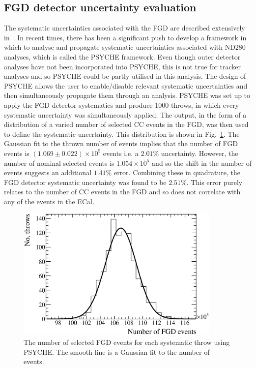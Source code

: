 \subsection{FGD detector uncertainty evaluation}
\label{subsec:FGDDetectorSystematics}
The systematic uncertainties associated with the FGD are described extensively in~\cite{CCIncSelFGDTN}.  In recent times, there has been a significant push to develop a framework in which to analyse and propagate systematic uncertainties associated with ND280 analyses, which is called the PSYCHE framework.  Even though outer detector analyses have not been incorporated into PSYCHE, this is not true for tracker analyses and so PSYCHE could be partly utilised in this analysis.  The design of PSYCHE allows the user to enable/disable relevant systematic uncertainties and then simultaneously propagate them through an analysis.  PSYCHE was set up to apply the FGD detector systematics and produce 1000 throws, in which every systematic uncertainty was simultaneously applied.  The output, in the form of a distribution of a varied number of selected CC events in the FGD, was then used to define the systematic uncertainty.  This distribution is shown in Fig.~\ref{fig:FGDSystematicsNEvents}.  The Gaussian fit to the thrown number of events implies that the number of FGD events is $(1.069\pm0.022)\times10^5$ events i.e. a $2.01\%$ uncertainty.  However, the number of nominal selected events is $1.054\times10^5$ and so the shift in the number of events suggests an additional $1.41\%$ error.  Combining these in quadrature, the FGD detector systematic uncertainty was found to be $2.51\%$.  This error purely relates to the number of CC events in the FGD and so does not correlate with any of the events in the ECal.
\begin{figure}
  \centering
  \includegraphics[width=10cm]{images/measurement/systematics/detector/fgd/fgd_systematics_nevents.eps}
  \caption{The number of selected FGD events for each systematic throw using PSYCHE.  The smooth line is a Gaussian fit to the number of events.}
  \label{fig:FGDSystematicsNEvents}
\end{figure}
